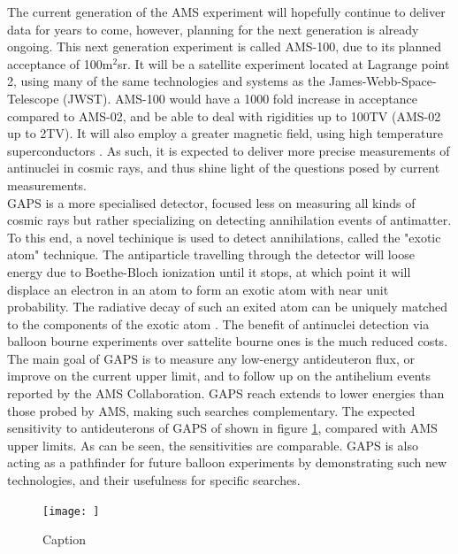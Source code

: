 The current generation of the AMS experiment will hopefully continue to deliver data for years to come, however, planning for the next generation is already ongoing. This next generation experiment is called AMS-100, due to its planned acceptance of 100m$^2$sr. It will be a satellite experiment located at Lagrange point 2, using many of the same technologies and systems as the James-Webb-Space-Telescope (JWST). AMS-100 would have a 1000 fold increase in acceptance compared to AMS-02, and be able to deal with rigidities up to 100TV (AMS-02 up to 2TV). It will also employ a greater magnetic field, using high temperature superconductors \cite{}. As such, it is expected to deliver more precise measurements of antinuclei in cosmic rays, and thus shine light of the questions posed by current measurements.\\

GAPS is a more specialised detector, focused less on measuring all kinds of cosmic rays but rather specializing on detecting annihilation events of antimatter. To this end, a novel techinique is used to detect annihilations, called the "exotic atom" technique. The antiparticle travelling through the detector will loose energy due to Boethe-Bloch ionization until it stops, at which point it will displace an electron in an atom to form an exotic atom with near unit probability. The radiative decay of such an exited atom can be uniquely matched to the components of the exotic atom \cite{}. The benefit of antinuclei detection via balloon bourne experiments over sattelite bourne ones is the much reduced costs.\\

The main goal of GAPS is to measure any low-energy antideuteron flux, or improve on the current upper limit, and to follow up on the antihelium events reported by the AMS Collaboration. GAPS reach extends to lower energies than those probed by AMS, making such searches complementary. The expected sensitivity to antideuterons of GAPS of shown in figure \ref{fig:GAPS_sensitivity}, compared with AMS upper limits. As can be seen, the sensitivities are comparable. GAPS is also acting as a pathfinder for future balloon experiments by demonstrating such new technologies, and their usefulness for specific searches. 

\begin{figure}
    \centering
    \texttt{[image: ]}
    \caption{Caption}
    \label{fig:GAPS_sensitivity}
\end{figure}





